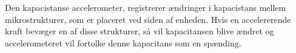 Den kapacistanse accelerometer, registrerer ændringer i kapacistans mellem mikrostrukturer, som er placeret ved siden af enheden. Hvis en accelererende kraft bevæger en af disse strukturer, så vil kapacitansen blive ændret og accelerometeret vil fortolke denne kapacitans som en spænding.  \citep{Goodrich2013}
